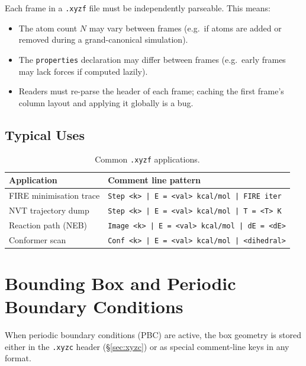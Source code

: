 \documentclass[12pt, a4paper, oneside]{article}
\begin{document}
Each frame in a \texttt{.xyzf} file must be independently parseable.
This means:

\begin{itemize}
  \item The atom count $N$ may vary between frames (e.g.\ if atoms
        are added or removed during a grand-canonical simulation).
  \item The \texttt{properties} declaration may differ between frames
        (e.g.\ early frames may lack forces if computed lazily).
  \item Readers must re-parse the header of each frame; caching the
        first frame's column layout and applying it globally is a bug.
\end{itemize}

\subsection{Typical Uses}

\begin{table}[htbp]
  \centering
  \caption{Common \texttt{.xyzf} applications.}
  \label{tab:xyzf_uses}
  \begin{tabular}{lp{8cm}}
    \toprule
    Application & Comment line pattern \\
    \midrule
    FIRE minimisation trace  & \texttt{Step <k> | E = <val> kcal/mol | FIRE iter} \\
    NVT trajectory dump      & \texttt{Step <k> | E = <val> kcal/mol | T = <T> K} \\
    Reaction path (NEB)      & \texttt{Image <k> | E = <val> kcal/mol | dE = <dE>} \\
    Conformer scan           & \texttt{Conf <k> | E = <val> kcal/mol | <dihedral>} \\
    \bottomrule
  \end{tabular}
\end{table}

\section{Bounding Box and Periodic Boundary Conditions}
\label{sec:pbc}

When periodic boundary conditions (PBC) are active, the box geometry
is stored either in the \texttt{.xyzc} header (§\ref{sec:xyzc}) or
as special comment-line keys in any format.
\end{document}
